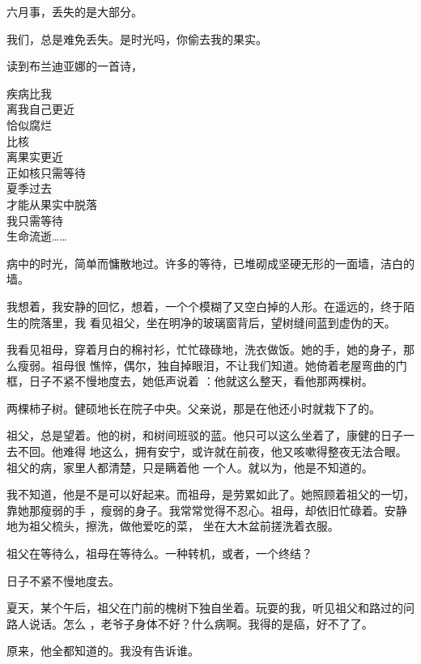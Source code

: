 \documentclass[12pt,a4paper]{article}
\begin{document}
		六月事，丢失的是大部分。\par
		我们，总是难免丢失。是时光吗，你偷去我的果实。

	\endwriting



		读到布兰迪亚娜的一首诗，

		\longpoem{}{}{}
		疾病比我 \\
		离我自己更近 \\
		恰似腐烂 \\
		比核 \\
		离果实更近 \\
		正如核只需等待 \\
		夏季过去 \\
		才能从果实中脱落 \\
		我只需等待 \\
		生命流逝……
		\endlongpoem

		病中的时光，简单而慵散地过。许多的等待，已堆砌成坚硬无形的一面墙，洁白的墙。

		我想着，我安静的回忆，想着，一个个模糊了又空白掉的人形。在遥远的，终于陌生的院落里，我
	看见祖父，坐在明净的玻璃窗背后，望树缝间蓝到虚伪的天。

		我看见祖母，穿着月白的棉衬衫，忙忙碌碌地，洗衣做饭。她的手，她的身子，那么瘦弱。祖母很
	憔悴，偶尔，独自掉眼泪，不让我们知道。她倚着老屋弯曲的门框，日子不紧不慢地度去，她低声说着
	：他就这么整天，看他那两棵树。

		两棵柿子树。健硕地长在院子中央。父亲说，那是在他还小时就栽下了的。

		祖父，总是望着。他的树，和树间班驳的蓝。他只可以这么坐着了，康健的日子一去不回。他难得
	地这么，拥有安宁，或许就在前夜，他又咳嗽得整夜无法合眼。祖父的病，家里人都清楚，只是瞒着他
	一个人。就以为，他是不知道的。

		我不知道，他是不是可以好起来。而祖母，是劳累如此了。她照顾着祖父的一切，靠她那瘦弱的手
	，瘦弱的身子。我常常觉得不忍心。祖母，却依旧忙碌着。安静地为祖父梳头，擦洗，做他爱吃的菜，
	坐在大木盆前搓洗着衣服。

		祖父在等待么，祖母在等待么。一种转机，或者，一个终结？

		日子不紧不慢地度去。

		夏天，某个午后，祖父在门前的槐树下独自坐着。玩耍的我，听见祖父和路过的问路人说话。怎么
	，老爷子身体不好？什么病啊。我得的是癌，好不了了。

		原来，他全都知道的。我没有告诉谁。
\end{document}
